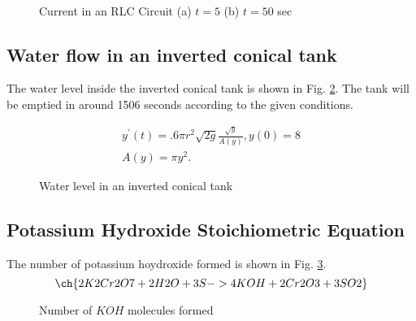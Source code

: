 \documentclass[11pt]{article}
\begin{document}

\begin{figure}
     \centering
    		 \subfloat[][]{ \label{tb_5}}\\
		 \subfloat[][]{ \label{tb_50}}
     \caption{Current in an RLC Circuit (a) $t = 5$ (b) $t = 50$ sec}
     \label{fig:RLC}
\end{figure}


\subsection{Water flow in an inverted conical tank}

The water level inside the inverted conical tank is shown in Fig. \ref{fig:tank}. The tank will be emptied in around 1506 seconds according to the given conditions.

\begin{align*} 
y^{\prime}(t) = .6\pi r^2 \sqrt{2g}\frac{\sqrt{y}}{A(y)}, y(0) = 8\\
A(y) = \pi y^2.
\end{align*} 

\begin{figure}
     \centering
    		{ \label{n_11}}
     \caption{Water level in an inverted conical tank}
     \label{fig:tank}
\end{figure}
%
%
\subsection{Potassium Hydroxide Stoichiometric Equation}

The number of potassium hoydroxide formed is shown in Fig. \ref{fig:CHEM}.
\begin{equation} 
\ch{2 K2Cr2O7 + 2 H2O + 3 S -> 4 KOH + 2 Cr2O3 + 3 SO2}
\end{equation} 


\begin{figure}
     \centering
    		 { \label{n_11}}
     \caption{Number of $KOH$ molecules formed}
     \label{fig:CHEM}
\end{figure}
%
%


\end{document}
